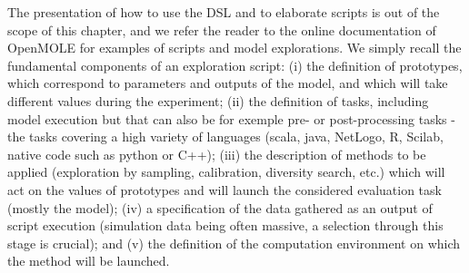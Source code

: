 \documentclass[10pt]{article}
\begin{document}
The presentation of how to use the DSL and to elaborate scripts is out of the scope of this chapter, and we refer the reader to the online documentation of OpenMOLE for examples of scripts and model explorations. We simply recall the fundamental components of an exploration script: (i) the definition of prototypes, which correspond to parameters and outputs of the model, and which will take different values during the experiment; (ii) the definition of tasks, including model execution but that can also be for exemple pre- or post-processing tasks - the tasks covering a high variety of languages (scala, java, NetLogo, R, Scilab, native code such as python or C++); (iii) the description of methods to be applied (exploration by sampling, calibration, diversity search, etc.) which will act on the values of prototypes and will launch the considered evaluation task (mostly the model); (iv) a specification of the data gathered as an output of script execution (simulation data being often massive, a selection through this stage is crucial); and (v) the definition of the computation environment on which the method will be launched.
\end{document}
